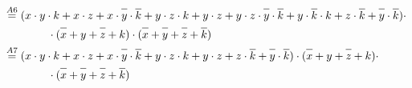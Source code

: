 \documentclass{article}
\newcommand*{\oline}[1]{\overline{#1\mathstrut}}
\newcommand{\bigspace}{\quad\quad\quad\quad}
\begin{document}
\begin{align*}
  &\overset{A6}{=} (x \cdot y \cdot k + x \cdot z + x \cdot \oline{y} \cdot \oline{k} + y \cdot z \cdot k + y \cdot z + y \cdot z \cdot \oline{y} \cdot \oline{k} + y \cdot \oline{k} \cdot k + z \cdot \oline{k} + \oline{y} \cdot \oline{k}) \cdot\\
  &\bigspace \cdot (\oline{x}+y+\oline{z}+k) \cdot (\oline{x}+\oline{y}+\oline{z}+\oline{k})\\
  &\overset{A7}{=} (x \cdot y \cdot k + x \cdot z + x \cdot \oline{y} \cdot \oline{k} + y \cdot z \cdot k + y \cdot z + z \cdot \oline{k} + \oline{y} \cdot \oline{k}) \cdot (\oline{x}+y+\oline{z}+k) \cdot\\
  &\bigspace \cdot (\oline{x}+\oline{y}+\oline{z}+\oline{k})
\end{align*}

\newpage
\end{document}

